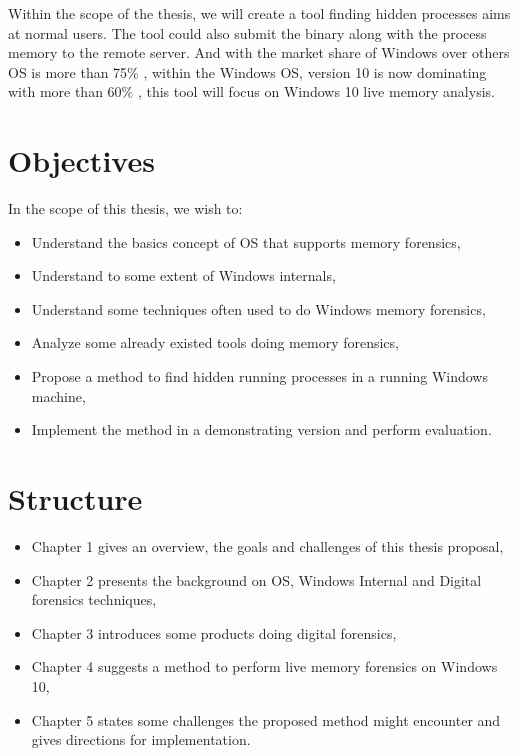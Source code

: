Within the scope of the thesis, we will create a tool finding hidden processes aims at normal users. The tool could also submit the binary along with the process memory to the remote server. And with the market share of Windows over others OS is more than 75\% \cite{osMarketShare}, within the Windows OS, version 10 is now dominating with more than 60\% \cite{windowsShare}, this tool will focus on Windows 10 live memory analysis.

\section[Objectives]{Objectives}

In the scope of this thesis, we wish to:

\begin{itemize}
  \item Understand the basics concept of OS that supports memory forensics,
  \item Understand to some extent of Windows internals,
  \item Understand some techniques often used to do Windows memory forensics,
  \item Analyze some already existed tools doing memory forensics,
  \item Propose a method to find hidden running processes in a running Windows machine,
  \item Implement the method in a demonstrating version and perform evaluation.
\end{itemize}

\newpage
\section[Structure]{Structure}

\begin{itemize}
  \item Chapter 1 gives an overview, the goals and challenges of this thesis proposal,
  \item Chapter 2 presents the background on OS, Windows Internal and Digital forensics techniques,
  \item Chapter 3 introduces some products doing digital forensics,
  \item Chapter 4 suggests a method to perform live memory forensics on Windows 10,
  \item Chapter 5 states some challenges the proposed method might encounter and gives directions for implementation.
\end{itemize}

